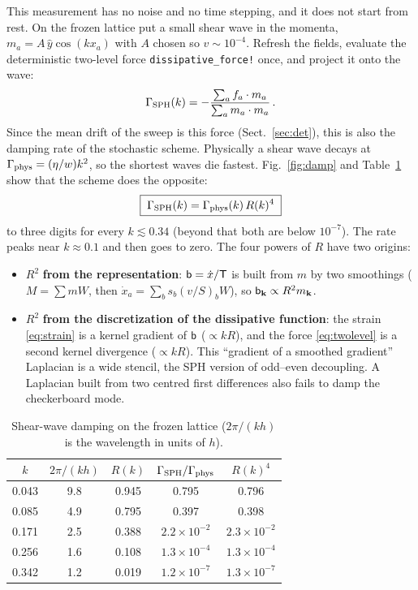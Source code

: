 \documentclass[12pt,aps,preprint,nofootinbib,noshowkeys,noshowpacs,longbibliography,superscriptaddress,tightenlines]{revtex4-2}
\def\bbeta{{\sf b}}
\def\Teff{{\sf T}}
\def\Fig#1{Fig.~\ref{#1}}
\def\Sect#1{Sect.~\ref{#1}}
\def\st{\begin{equation}}
\def\stp{\end{equation}}
\begin{document}
This measurement has no noise and no time stepping, and it does not start
from rest.  On the frozen lattice put a small shear wave in the momenta,
$m_a=A\,\hat y\cos(kx_a)$ with $A$ chosen so $v\sim10^{-4}$.  Refresh the
fields, evaluate the deterministic two-level force \texttt{dissipative\_force!}
once, and project it onto the wave:
\st
\Gamma_{\rm SPH}(k) = -\frac{\sum_a f_a\cdot m_a}{\sum_a m_a\cdot m_a}\,.
\stp
Since the mean drift of the sweep is this force (\Sect{sec:det}), this is also
the damping rate of the stochastic scheme.  Physically a shear wave decays at
$\Gamma_{\rm phys}=(\eta/w)k^2$, so the shortest waves die fastest.
\Fig{fig:damp} and Table~\ref{tab:damp} show that the scheme does the opposite:
\st
\boxed{\;\Gamma_{\rm SPH}(k) = \Gamma_{\rm phys}(k)\,R(k)^4\;}
\label{eq:R4}
\stp
to three digits for every $k\lesssim0.34$ (beyond that both are below
$10^{-7}$).  The rate peaks near $k\approx0.1$ and then goes to zero.  The four
powers of $R$ have two origins:
\begin{itemize}
  \item $R^2$ \textbf{from the representation}: $\bbeta=\dot x/\Teff$ is built
        from $m$ by two smoothings ($M=\sum m W$, then
        $\dot x_a=\sum_b s_b (v/S)_b W$), so $\bbeta_{\mathbf k}\propto R^2 m_{\mathbf k}$.
  \item $R^2$ \textbf{from the discretization of the dissipative function}:
        the strain \eqref{eq:strain} is a kernel gradient of $\bbeta$
        ($\propto kR$), and the force \eqref{eq:twolevel} is a second kernel
        divergence ($\propto kR$).  This ``gradient of a smoothed gradient''
        Laplacian is a wide stencil, the SPH version of odd--even decoupling.
        A Laplacian built from two centred first differences also fails to
        damp the checkerboard mode.
\end{itemize}

\begin{table}[t]
\centering
\begin{tabular}{ccccc}
$k$ & $2\pi/(kh)$ & $R(k)$ & $\Gamma_{\rm SPH}/\Gamma_{\rm phys}$ & $R(k)^4$ \\ \hline
0.043 & 9.8 & 0.945 & 0.795 & 0.796 \\
0.085 & 4.9 & 0.795 & 0.397 & 0.398 \\
0.171 & 2.5 & 0.388 & $2.2\times10^{-2}$ & $2.3\times10^{-2}$ \\
0.256 & 1.6 & 0.108 & $1.3\times10^{-4}$ & $1.3\times10^{-4}$ \\
0.342 & 1.2 & 0.019 & $1.2\times10^{-7}$ & $1.3\times10^{-7}$
\end{tabular}
\caption{Shear-wave damping on the frozen lattice ($2\pi/(kh)$ is the
wavelength in units of $h$).}
\label{tab:damp}
\end{table}
\end{document}
